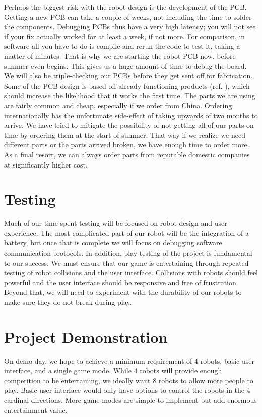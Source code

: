 \documentclass[11pt]{ieeeconf}
\begin{document}
Perhaps the biggest risk with the robot design is the development of the PCB. Getting a new PCB can take a couple of weeks, not including the time to solder the components. Debugging PCBs thus have a very high latency; you will not see if your fix actually worked for at least a week, if not more. For comparison, in software all you have to do is compile and rerun the code to test it, taking a matter of minutes. That is why we are starting the robot PCB now, before summer even begins. This gives us a huge amount of time to debug the board. We will also be triple-checking our PCBs before they get sent off for fabrication. Some of the PCB design is based off already functioning products (ref. \cite{feather}), which should increase the likelihood that it works the first time. The parts we are using are fairly common and cheap, especially if we order from China. Ordering internationally has the unfortunate side-effect of taking upwards of two months to arrive. We have tried to mitigate the possibility of not getting all of our parts on time by ordering them at the start of summer. That way if we realize we need different parts or the parts arrived broken, we have enough time to order more. As a final resort, we can always order parts from reputable domestic companies at significantly higher cost.

\section{Testing}
Much of our time spent testing will be focused on robot design and user experience. The most complicated part of our robot will be the integration of a battery, but once that is complete we will focus on debugging software communication protocols. In addition, play-testing of the project is fundamental to our success. We must ensure that our game is entertaining through repeated testing of robot collisions and the user interface. Collisions with robots should feel powerful and the user interface should be responsive and free of frustration. Beyond that, we will need to experiment with the durability of our robots to make sure they do not break during play.

\section{Project Demonstration}

On demo day, we hope to achieve a minimum requirement of 4 robots, basic user interface, and a single game mode. While 4 robots will provide enough competition to be entertaining, we ideally want 8 robots to allow more people to play. Basic user interface would only have options to control the robots in the 4 cardinal directions. More game modes are simple to implement but add enormous entertainment value.
\end{document}
